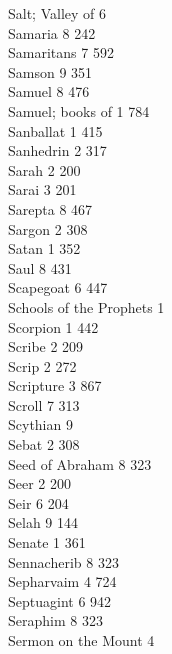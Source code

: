Salt; Valley of \hfill 6 \\
Samaria \hfill 8 \quad \phantom{0}242\\
Samaritans \hfill 7 \quad \phantom{0}592\\
Samson \hfill 9 \quad \phantom{0}351\\
Samuel \hfill 8 \quad \phantom{0}476\\
Samuel; books of \hfill 1 \quad \phantom{0}784\\
Sanballat \hfill 1 \quad \phantom{0}415\\
Sanhedrin \hfill 2 \quad \phantom{0}317\\
Sarah \hfill 2 \quad \phantom{0}200\\
Sarai \hfill 3 \quad \phantom{0}201\\
Sarepta \hfill 8 \quad \phantom{0}467\\
Sargon \hfill 2 \quad \phantom{0}308\\
Satan \hfill 1 \quad \phantom{0}352\\
Saul \hfill 8 \quad \phantom{0}431\\
Scapegoat \hfill 6 \quad \phantom{0}447\\
Schools of the Prophets \hfill 1 \\
Scorpion \hfill 1 \quad \phantom{0}442\\
Scribe \hfill 2 \quad \phantom{0}209\\
Scrip \hfill 2 \quad \phantom{0}272\\
Scripture \hfill 3 \quad \phantom{0}867\\
Scroll \hfill 7 \quad \phantom{0}313\\
Scythian \hfill 9 \\
Sebat \hfill 2 \quad \phantom{0}308\\
Seed of Abraham \hfill 8 \quad \phantom{0}323\\
Seer \hfill 2 \quad \phantom{0}200\\
Seir \hfill 6 \quad \phantom{0}204\\
Selah \hfill 9 \quad \phantom{0}144\\
Senate \hfill 1 \quad \phantom{0}361\\
Sennacherib \hfill 8 \quad \phantom{0}323\\
Sepharvaim \hfill 4 \quad \phantom{0}724\\
Septuagint \hfill 6 \quad \phantom{0}942\\
Seraphim \hfill 8 \quad \phantom{0}323\\
Sermon on the Mount \hfill 4 \\
